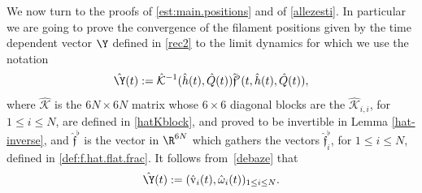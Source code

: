 We now turn to the proofs of \eqref{est:main.positions} and of
\eqref{allezesti}.
In particular we are going to prove the convergence of the filament positions given by the time dependent vector
$\Y$ defined in
\eqref{rec2} to the limit dynamics for which we use the notation
\begin{equation}\label{def.hatY}
\hat \Y(t) := \hat {\mathcal K}^{-1}(\hat h(t), \hat Q(t)) \hat {\mathfrak{f}}^\flat(t, \hat h(t), \hat Q(t)),
\end{equation}
where
$\hat {\mathcal K}$ is
the $6N \times 6N$ matrix whose $6 \times 6$ diagonal blocks are the $\hat{\mathcal K}_{i,i}$, for $1 \leq i \leq N$, are defined in
\eqref{hatKblock}, and proved to be invertible in Lemma \ref{hat-inverse}, and $\hat {\mathfrak{f}}^\flat$ is the vector in $\R^{6N}$ which gathers the vectors $\hat{\mathfrak{f}}_i^\flat$,
for $1 \leq i \leq N$, defined in
\eqref{def:f.hat.flat.frac}.
It follows from~\eqref{debaze} that
\begin{equation} \label{debaze-hat}
\hat \Y(t) := (\hat{\textrm{v}}_i(t),{\hat \omega}_i (t))_{1 \leq i \leq N}.
\end{equation}

